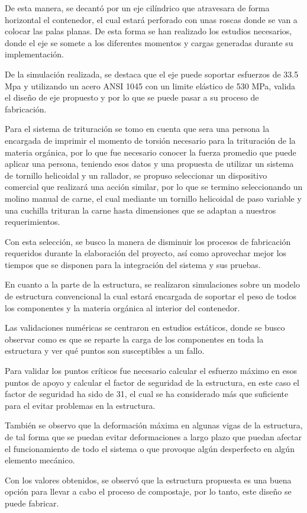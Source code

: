 De esta manera, se decantó por un eje cilíndrico que atravesara de forma horizontal el contenedor, el cual estará perforado con unas roscas donde se van a colocar las palas planas. De esta forma se han realizado los estudios necesarios, donde el eje se somete a los diferentes momentos y cargas generadas durante su implementación.

De la simulación realizada, se destaca que el eje puede soportar esfuerzos de 33.5 Mpa y utilizando un acero ANSI 1045 con un limite elástico de 530 MPa, valida el diseño de eje propuesto y por lo que se puede pasar a su proceso de fabricación.

Para el sistema de trituración se tomo en cuenta que sera una persona la encargada de imprimir el momento de torsión necesario para la trituración de la materia orgánica, por lo que fue necesario conocer la fuerza promedio que puede aplicar una persona, teniendo esos datos y una propuesta de utilizar un sistema de tornillo helicoidal y un rallador, se propuso seleccionar un dispositivo comercial que realizará una acción similar, por lo que se termino seleccionando un molino manual de carne, el cual mediante un tornillo helicoidal de paso variable y una cuchilla trituran la carne hasta dimensiones que se adaptan a nuestros requerimientos.

Con esta selección, se busco la manera de disminuir los procesos de fabricación requeridos durante la elaboración del proyecto, así como aprovechar mejor los tiempos que se disponen para la integración del sistema y sus pruebas.

En cuanto a la parte de la estructura, se realizaron simulaciones sobre un modelo de estructura convencional la cual estará encargada de soportar el peso de todos los componentes y la materia orgánica al interior del contenedor. 

Las validaciones numéricas se centraron en estudios estáticos, donde se busco observar como es que se reparte la carga de los componentes en toda la estructura y ver qué puntos son susceptibles a un fallo. 

Para validar los puntos críticos fue necesario calcular el esfuerzo máximo en esos puntos de apoyo y calcular el factor de seguridad de la estructura, en este caso el factor de seguridad ha sido de 31, el cual se ha considerado más que suficiente para el evitar problemas en la estructura.

También se observo que la deformación máxima en algunas vigas de la estructura, de tal forma que se puedan evitar deformaciones a largo plazo que puedan afectar el funcionamiento de todo el sistema o que provoque algún desperfecto en algún elemento mecánico.

Con los valores obtenidos, se observó que la estructura propuesta es una buena opción para llevar a cabo el proceso de compostaje, por lo tanto, este diseño se puede fabricar.